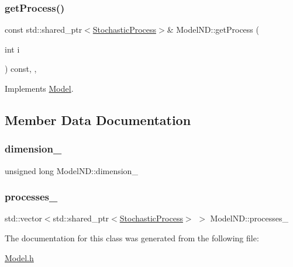 \subsubsection{\texorpdfstring{get\+Process()}{getProcess()}\hspace{0.1cm}{\footnotesize\ttfamily [2/2]}}
{\footnotesize\ttfamily const std\+::shared\+\_\+ptr$<$\hyperlink{class_stochastic_process}{Stochastic\+Process}$>$\& Model\+N\+D\+::get\+Process (\begin{DoxyParamCaption}\item[{int}]{i }\end{DoxyParamCaption}) const\hspace{0.3cm}{\ttfamily [inline]}, {\ttfamily [override]}, {\ttfamily [virtual]}}



Implements \hyperlink{class_model_a23adaaf21b2955a1f4d4893ad9b77f02}{Model}.



\subsection{Member Data Documentation}
\hypertarget{class_model_n_d_ac86872437daeeffeb8fb1b387bea28f8}{}\label{class_model_n_d_ac86872437daeeffeb8fb1b387bea28f8} 
\subsubsection{\texorpdfstring{dimension\+\_\+}{dimension\_}}
{\footnotesize\ttfamily unsigned long Model\+N\+D\+::dimension\+\_\+\hspace{0.3cm}{\ttfamily [protected]}}

\hypertarget{class_model_n_d_a9cb778073c54caae0ffea17a59a9a2f9}{}\label{class_model_n_d_a9cb778073c54caae0ffea17a59a9a2f9} 
\subsubsection{\texorpdfstring{processes\+\_\+}{processes\_}}
{\footnotesize\ttfamily std\+::vector$<$std\+::shared\+\_\+ptr$<$\hyperlink{class_stochastic_process}{Stochastic\+Process}$>$ $>$ Model\+N\+D\+::processes\+\_\+\hspace{0.3cm}{\ttfamily [protected]}}



The documentation for this class was generated from the following file\+:\begin{DoxyCompactItemize}
\item 
\hyperlink{_model_8h}{Model.\+h}\end{DoxyCompactItemize}
